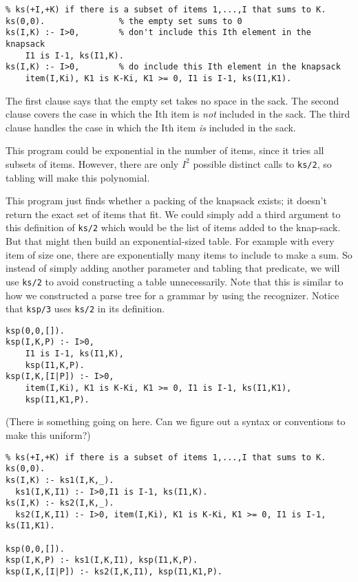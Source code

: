 \begin{verbatim}
% ks(+I,+K) if there is a subset of items 1,...,I that sums to K.
ks(0,0).               % the empty set sums to 0
ks(I,K) :- I>0,        % don't include this Ith element in the knapsack
    I1 is I-1, ks(I1,K).
ks(I,K) :- I>0,        % do include this Ith element in the knapsack
    item(I,Ki), K1 is K-Ki, K1 >= 0, I1 is I-1, ks(I1,K1).
\end{verbatim}

The first clause says that the empty set takes no space in the sack.
The second clause covers the case in which the Ith item is {\em not}
included in the sack.  The third clause handles the case in which the
Ith item {\em is} included in the sack.

This program could be exponential in the number of items, since it
tries all subsets of items.  However, there are only $I^2$ possible
distinct calls to \verb|ks/2|, so tabling will make this polynomial.

This program just finds whether a packing of the knapsack exists; it
doesn't return the exact set of items that fit.  We could simply add a
third argument to this definition of \verb|ks/2| which would be the
list of items added to the knap-sack.  But that might then build an
exponential-sized table.  For example with every item of size one,
there are exponentially many items to include to make a sum.  So
instead of simply adding another parameter and tabling that predicate,
we will use \verb|ks/2| to avoid constructing a table unnecessarily.
Note that this is similar to how we constructed a parse tree for a
grammar by using the recognizer.  Notice that \verb|ksp/3| uses
\verb|ks/2| in its definition.

\begin{verbatim}
ksp(0,0,[]).
ksp(I,K,P) :- I>0,
    I1 is I-1, ks(I1,K),
    ksp(I1,K,P).
ksp(I,K,[I|P]) :- I>0,
    item(I,Ki), K1 is K-Ki, K1 >= 0, I1 is I-1, ks(I1,K1),
    ksp(I1,K1,P).
\end{verbatim}

(There is something going on here.  Can we figure out a syntax or
conventions to make this uniform?)

\begin{verbatim}
% ks(+I,+K) if there is a subset of items 1,...,I that sums to K.
ks(0,0).
ks(I,K) :- ks1(I,K,_).
  ks1(I,K,I1) :- I>0,I1 is I-1, ks(I1,K).
ks(I,K) :- ks2(I,K,_).
  ks2(I,K,I1) :- I>0, item(I,Ki), K1 is K-Ki, K1 >= 0, I1 is I-1, ks(I1,K1).

ksp(0,0,[]).
ksp(I,K,P) :- ks1(I,K,I1), ksp(I1,K,P).
ksp(I,K,[I|P]) :- ks2(I,K,I1), ksp(I1,K1,P).
\end{verbatim}



